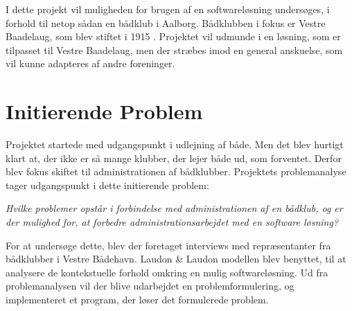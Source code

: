 I dette projekt vil muligheden for brugen af en softwareløsning undersøges, i forhold til netop sådan en bådklub i Aalborg. Bådklubben i fokus er Vestre Baadelaug, som blev stiftet i 1915 \cite{vb_historie}. Projektet vil udmunde i en løsning, som er tilpasset til Vestre Baadelaug, men der stræbes imod en general anskuelse, som vil kunne adapteres af andre foreninger.

\section{Initierende Problem}
\label{initierende}

Projektet startede med udgangspunkt i udlejning af både. Men det blev hurtigt klart at, der ikke er så mange klubber, der lejer både ud, som forventet. Derfor blev fokus skiftet til administrationen af bådklubber. Projektets problemanalyse tager udgangspunkt i dette initierende problem:

\textit{Hvilke problemer opstår i forbindelse med administrationen af en bådklub, og er der mulighed for, at forbedre administrationsarbejdet med en software løsning?}

For at undersøge dette, blev der foretaget interviews med repræsentanter fra bådklubber i Vestre Bådehavn. Laudon \& Laudon modellen blev benyttet, til at analysere de kontekstuelle forhold omkring en mulig softwareløsning. Ud fra problemanalysen vil der blive udarbejdet en problemformulering, og implementeret et program, der løser det formulerede problem.